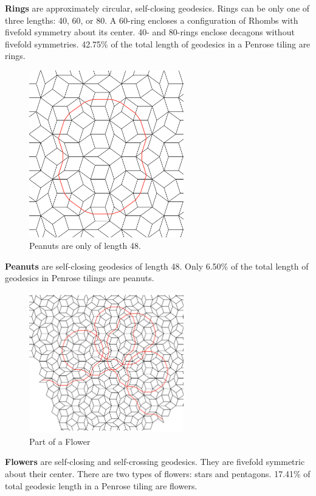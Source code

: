 \documentclass[
  oneside,
  11pt, a4paper,
  footinclude=true,
  headinclude=true,
  cleardoublepage=empty
]{scrbook}
\begin{document}
\textbf{Rings} are approximately circular, self-closing geodesics. Rings can be only one of three lengths: 40, 60, or 80. A 60-ring encloses a configuration of Rhombs with fivefold symmetry about its center. 40- and 80-rings enclose decagons without fivefold symmetries. 42.75\% of the total length of geodesics in a Penrose tiling are rings.

\begin{figure}[H]
\centering
\includegraphics[width=0.6\textwidth]{Peanut}
\caption[Peanut]{Peanuts are only of length 48.}
\end{figure}
\textbf{Peanuts} are self-closing geodesics of length 48. Only 6.50\% of the total length of geodesics in Penrose tilings are peanuts. 
\begin{figure}[H]
\centering
\includegraphics[width=0.6\textwidth]{FlowerPart}
\caption[Flower Part]{Part of a Flower}
\end{figure}
\textbf{Flowers} are self-closing and self-crossing geodesics. They are fivefold symmetric about their center. There are two types of flowers: stars and pentagons. 17.41\% of total geodesic length in a Penrose tiling are flowers. 
\end{document}
